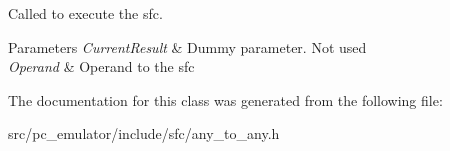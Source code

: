 Called to execute the sfc. 


\begin{DoxyParams}{Parameters}
{\em Current\+Result} & Dummy parameter. Not used \\
\hline
{\em Operand} & Operand to the sfc \\
\hline
\end{DoxyParams}


The documentation for this class was generated from the following file\+:\begin{DoxyCompactItemize}
\item 
src/pc\+\_\+emulator/include/sfc/any\+\_\+to\+\_\+any.\+h\end{DoxyCompactItemize}
